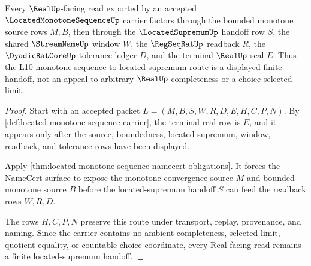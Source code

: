 \begin{theorem}
\label{thm:located-monotone-sequence-located-supremum-handoff}
Every $\RealUp$-facing read exported by an accepted $\LocatedMonotoneSequenceUp$ carrier factors through the bounded monotone source rows $M,B$, then through the $\LocatedSupremumUp$ handoff row $S$, the shared $\StreamNameUp$ window $W$, the $\RegSeqRatUp$ readback $R$, the $\DyadicRatCoreUp$ tolerance ledger $D$, and the terminal $\RealUp$ seal $E$. Thus the L10 monotone-sequence-to-located-supremum route is a displayed finite handoff, not an appeal to arbitrary $\RealUp$ completeness or a choice-selected limit.
\end{theorem}
\begin{proof}
Start with an accepted packet $L=(M,B,S,W,R,D,E,H,C,P,N)$. By \autoref{def:located-monotone-sequence-carrier}, the terminal real row is $E$, and it appears only after the source, boundedness, located-supremum, window, readback, and tolerance rows have been displayed.

Apply \autoref{thm:located-monotone-sequence-namecert-obligations}. It forces the NameCert surface to expose the monotone convergence source $M$ and bounded monotone source $B$ before the located-supremum handoff $S$ can feed the readback rows $W,R,D$.

The rows $H,C,P,N$ preserve this route under transport, replay, provenance, and naming. Since the carrier contains no ambient completeness, selected-limit, quotient-equality, or countable-choice coordinate, every Real-facing read remains a finite located-supremum handoff.
\end{proof}




